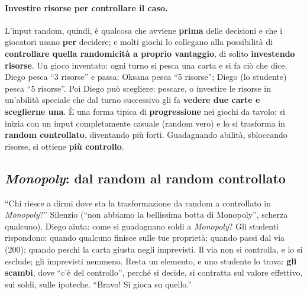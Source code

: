 \paragraph{Investire risorse per controllare il caso.} L'input random, quindi, è qualcosa
che avviene \textbf{prima} delle decisioni e che i giocatori usano \textbf{per} decidere; e
molti giochi lo collegano alla possibilità di \textbf{controllare quella randomicità a
proprio vantaggio}, di solito \textbf{investendo risorse}. Un gioco inventato: ogni turno si
pesca una carta e si fa ciò che dice. Diego pesca ``3 risorse'' e passa; Oksana pesca ``5
risorse''; Diego (lo studente) pesca ``5 risorse''. Poi Diego può scegliere: pescare, o
investire le risorse in un'abilità speciale che dal turno successivo gli fa \textbf{vedere
due carte e sceglierne una}. È una forma tipica di \textbf{progressione} nei giochi da
tavolo: si inizia con un input completamente casuale (random vero) e lo si trasforma in
\textbf{random controllato}, diventando più forti. Guadagnando abilità, sbloccando risorse,
si ottiene \textbf{più controllo}.

\subsection{\emph{Monopoly}: dal random al random controllato}

``Chi riesce a dirmi dove sta la trasformazione da random a controllato in
\emph{Monopoly}?'' Silenzio (``non abbiamo la bellissima botta di Monopoly'', scherza
qualcuno). Diego aiuta: come si guadagnano soldi a \emph{Monopoly}? Gli studenti rispondono:
quando qualcuno finisce sulle tue proprietà; quando passi dal via (200); quando peschi la
carta giusta negli imprevisti. Il via non si controlla, e lo si esclude; gli imprevisti
nemmeno. Resta un elemento, e uno studente lo trova: \textbf{gli scambi}, dove ``c'è del
controllo'', perché si decide, si contratta sul valore effettivo, sui soldi, sulle ipoteche.
``Bravo! Si gioca su quello.''

